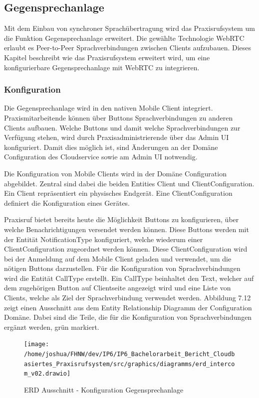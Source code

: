 \subsection{Gegensprechanlage}

Mit dem Einbau von synchroner Sprachübertragung wird das Praxisrufsystem um die Funktion Gegensprechanlage erweitert.
Die gewählte Technologie WebRTC erlaubt es Peer-to-Peer Sprachverbindungen zwischen Clients aufzubauen.
Dieses Kapitel beschreibt wie das Praxisrufsystem erweitert wird, um eine konfigurierbare Gegensprechanlage mit WebRTC zu integrieren.

\subsubsection{Konfiguration}

Die Gegensprechanlage wird in den nativen Mobile Client integriert.
Praxismitarbeitende können über Buttons Sprachverbindungen zu anderen Clients aufbauen.
Welche Buttons und damit welche Sprachverbindungen zur Verfügung stehen, wird durch Praxisadministrierende über das Admin UI konfiguriert.
Damit dies möglich ist, sind Änderungen an der Domäne Configuration des Cloudservice sowie am Admin UI notwendig.

Die Konfiguration von Mobile Clients wird in der Domäne Configuration abgebildet.
Zentral sind dabei die beiden Entities Client und ClientConfiguration.
Ein Client repräsentiert ein physisches Endgerät.
Eine ClientConfiguration definiert die Konfiguration eines Gerätes.

Praxisruf bietet bereits heute die Möglichkeit Buttons zu konfigurieren, über welche Benachrichtigungen versendet werden können.
Diese Buttons werden mit der Entität NotificationType konfiguriert, welche wiederum einer ClientConfiguration zugeordnet werden können.
Diese ClientConfiguration wird bei der Anmeldung auf dem Mobile Client geladen und verwendet, um die nötigen Buttons darzustellen.
Für die Konfiguration von Sprachverbindungen wird die Entität CallType erstellt.
Ein CallType beinhaltet den Text, welcher auf dem zugehörigen Button auf Clientseite angezeigt wird und eine Liste von Clients, welche als Ziel der Sprachverbindung verwendet werden.
Abbildung 7.12 zeigt einen Ausschnitt aus dem Entity Relationship Diagramm der Configuration Domäne.
Dabei sind die Teile, die für die Konfiguration von Sprachverbindungen ergänzt werden, grün markiert.

\begin{figure}[h]
    \centering
    \begin{minipage}[b]{0.7\textwidth}
        \texttt{[image: /home/joshua/FHNW/dev/IP6/IP6\_Bachelorarbeit\_Bericht\_Cloudbasiertes\_Praxisrufsystem/src/graphics/diagramms/erd\_intercom\_v02.drawio]}
        \caption{ERD Ausschnitt - Konfiguration Gegensprechanlage}
    \end{minipage}
\end{figure}

